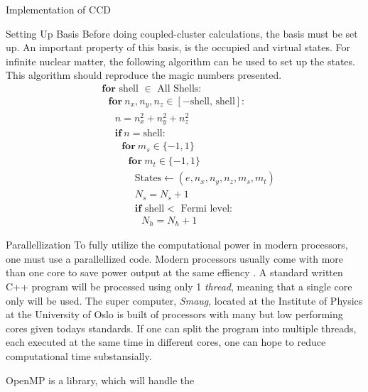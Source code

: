 \documentclass[twoside,english]{uiofysmaster}
\begin{document}
\begin{chapter}{Implementation of CCD}
	\begin{section}{Setting Up Basis}
		Before doing coupled-cluster calculations, the basis must be set up. An important property of this basis, is the occupied and virtual states. For infinite nuclear matter, the following algorithm can be used to set up the states. This algorithm should reproduce the magic numbers presented. 
		\begin{align*}
			&\mathbf{for } \text{ shell } \in \text{ All Shells}: \\
			&\:\:\:\mathbf{for } \: n_x, n_y, n_z \in [-\text{shell, shell} ]: \\
			&\:\:\:\:\:\:n = n_x^2 + n_y^2 + n_z^2 \\
			&\:\:\:\:\:\:\mathbf{if }\: n = \text{shell}: \\
			&\:\:\:\:\:\:\:\:\:\mathbf{for } \: m_s \in \{-1,1\} \\
			&\:\:\:\:\:\:\:\:\:\:\:\: \mathbf{for } \: m_t \in \{-1,1\} \\
			&\:\:\:\:\:\:\:\:\:\:\:\:\:\:\:\text{States} \leftarrow (e, n_x, n_y, n_z, m_s, m_t) \\
			&\:\:\:\:\:\:\:\:\:\:\:\:\:\:\:N_s = N_s + 1 \\
			&\:\:\:\:\:\:\:\:\:\:\:\:\:\:\:\mathbf{if } \text{ shell} < \text{ Fermi level}: \\
			&\:\:\:\:\:\:\:\:\:\:\:\:\:\:\:\:\:\: N_h = N_h + 1
		\end{align*}
	\end{section}

	\begin{section}{Parallellization}
		To fully utilize the computational power in modern processors, one must use a parallellized code. Modern processors usually come with more than one core to save power output at the same effiency \cite{IntelOpenMP}. A standard written C++ program will be processed using only 1 \textit{thread}, meaning that a single core only will be used. The super computer, \textit{Smaug}, located at the Institute of Physics at the University of Oslo is built of processors with many but low performing cores given todays standards. If one can split the program into multiple threads, each executed at the same time in different cores, one can hope to reduce computational time substansially. 
		
		OpenMP is a library, which will handle the 
	\end{section}

\end{chapter}
\end{document}
